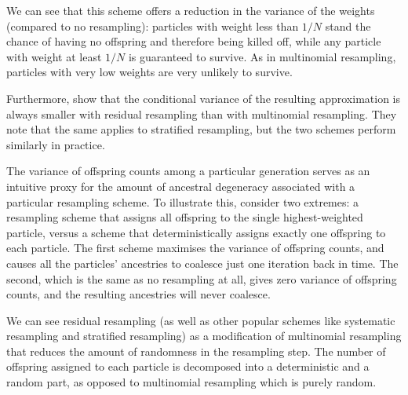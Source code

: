\documentclass[fleqn]{article}
\begin{document}
We can see that this scheme offers a reduction in the variance of the weights (compared to no resampling): particles with weight less than $1/N$ stand the chance of having no offspring and therefore being killed off, while any particle with weight at least $1/N$ is guaranteed to survive. As in multinomial resampling, particles with very low weights are very unlikely to survive.

Furthermore, \citet{douc2005} show that the conditional variance of the resulting approximation is always smaller with residual resampling than with multinomial resampling. They note that the same applies to stratified resampling, but the two schemes perform similarly in practice.

The variance of offspring counts among a particular generation serves as an intuitive proxy for the amount of ancestral degeneracy associated with a particular resampling scheme. To illustrate this, consider two extremes: a resampling scheme that assigns all offspring to the single highest-weighted particle, versus a scheme that deterministically assigns exactly one offspring to each particle. The first scheme maximises the variance of offspring counts, and causes all the particles' ancestries to coalesce just one iteration back in time. The second, which is the same as no resampling at all, gives zero variance of offspring counts, and the resulting ancestries will never coalesce.

We can see residual resampling (as well as other popular schemes like systematic resampling and stratified resampling) as a modification of multinomial resampling that reduces the amount of randomness in the resampling step. The number of offspring assigned to each particle is decomposed into a deterministic and a random part, as opposed to multinomial resampling which is purely random.
\end{document}
